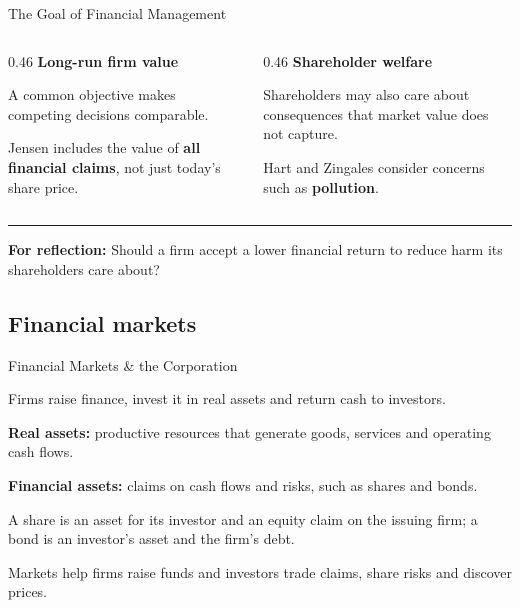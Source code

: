 \documentclass[9pt,aspectratio=169]{beamer}
\newenvironment{wideitemize}{\itemize\addtolength{\itemsep}{10pt}}{\enditemize}
\begin{document}
\begin{frame}{The Goal of Financial Management}
\begin{columns}[T,onlytextwidth]
\begin{column}{0.46\textwidth}
\textcolor{StAndrewsBlue}{\textbf{Long-run firm value}}\par\smallskip
A common objective makes competing decisions comparable.
\par\medskip
Jensen includes the value of \textbf{all financial claims}, not just today's share price.
\end{column}
\begin{column}{0.46\textwidth}
\textcolor{StAndrewsBlue}{\textbf{Shareholder welfare}}\par\smallskip
Shareholders may also care about consequences that market value does not capture.
\par\medskip
Hart and Zingales consider concerns such as \textbf{pollution}.
\end{column}
\end{columns}
\vspace{1.2em}
\textcolor{StAndrewsBlue}{\rule{\textwidth}{0.4pt}}\par\smallskip
\textbf{For reflection:} Should a firm accept a lower financial return to reduce harm its shareholders care about?
\end{frame}

\subsection{Financial markets}

\begin{frame}{Financial Markets \& the Corporation}
\begin{wideitemize}
\item Firms raise finance, invest it in real assets and return cash to investors.
\item \textbf{Real assets:} productive resources that generate goods, services and operating cash flows.
\item \textbf{Financial assets:} claims on cash flows and risks, such as shares and bonds.
\item A share is an asset for its investor and an equity claim on the issuing firm; a bond is an investor's asset and the firm's debt.
\item Markets help firms raise funds and investors trade claims, share risks and discover prices.
\end{wideitemize}
\end{frame}
\end{document}
